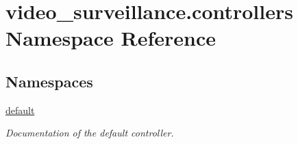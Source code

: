 \hypertarget{namespacevideo__surveillance_1_1controllers}{}\section{video\+\_\+surveillance.\+controllers Namespace Reference}
\label{namespacevideo__surveillance_1_1controllers}
\subsection*{Namespaces}
\begin{DoxyCompactItemize}
\item 
 \hyperlink{namespacevideo__surveillance_1_1controllers_1_1default}{default}
\begin{DoxyCompactList}\small\item\em Documentation of the default controller. \end{DoxyCompactList}\end{DoxyCompactItemize}

